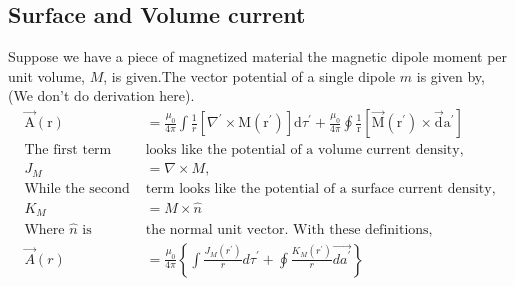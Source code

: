 \subsection{Surface and Volume current}
Suppose we have a piece of magnetized material the magnetic dipole moment per unit volume, ${M}$, is given.The vector potential of a single dipole ${m}$ is given by, (We don't do derivation here).
\begin{align*}
\vec{\mathrm{A}}(\mathrm{r})&=\frac{\mu_{0}}{4 \pi} \int \frac{1}{r}\left[\nabla^{\prime} \times \mathrm{M}\left(\mathrm{r}^{\prime}\right)\right] \mathrm{d} \tau^{\prime}+\frac{\mu_{0}}{4 \pi} \oint \frac{1}{\mathrm{r}}\left[\vec{\mathrm{M}}\left(\mathrm{r}^{\prime}\right) \times \vec{\mathrm{d}} \mathrm{a}^{\prime}\right]\\
\text{The first term }&\text{looks like the potential of a volume current density,}\\
{J}_{M}&=\nabla \times {M},\\
\text{While the second }&\text{term looks like the potential of a surface current density,}\\
{K}_{M}&={M} \times \hat{n}\\
\text{Where $\hat{n}$ is }&\text{the normal unit vector. With these definitions,}\\
\vec{A}({r})&=\frac{\mu_{0}}{4 \pi}\left\{\int \frac{{J}_{M}\left({r}^{\prime}\right)}{r} d\tau^{\prime}+\oint \frac{{K}_{M}\left({r}^{\prime}\right)}{r} \vec{d a^{\prime}}\right\}
\end{align*}
